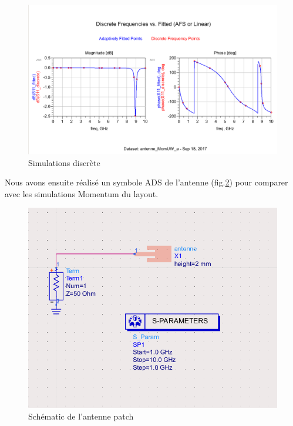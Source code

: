 \documentclass[a4paper]{article}
\begin{document}
\begin{figure}[!htb]
\begin{center}
  \includegraphics[scale=0.42]{Simulation-Layout-Antenne-EM.png}
  \caption{Simulations discr\`ete}
  \label{Simulation-Layout-Antenne-EM}
\end{center}
\end{figure}

Nous avons ensuite r\'ealis\'e un symbole ADS de l'antenne (fig.\ref{schematic_antenne_simu}) pour comparer avec les simulations Momentum du layout.

\begin{figure}[!htb]
\begin{center}
  \includegraphics[scale=0.37]{schematic_antenne_simu.png}
  \caption{Sch\'ematic de l'antenne patch}
  \label{schematic_antenne_simu}
\end{center}
\end{figure}
\end{document}
